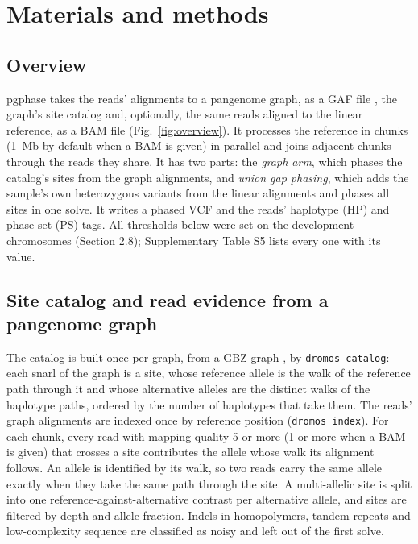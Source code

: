 \section{Materials and methods}

\subsection{Overview}

pgphase takes the reads' alignments to a pangenome graph, as a GAF file \citep{Li2020}, the graph's site catalog and, optionally, the same reads aligned to the linear reference, as a BAM file (Fig.~\ref{fig:overview}). It processes the reference in chunks (1~Mb by default when a BAM is given) in parallel and joins adjacent chunks through the reads they share. It has two parts: the \emph{graph arm}, which phases the catalog's sites from the graph alignments, and \emph{union gap phasing}, which adds the sample's own heterozygous variants from the linear alignments and phases all sites in one solve. It writes a phased VCF and the reads' haplotype (HP) and phase set (PS) tags. All thresholds below were set on the development chromosomes (Section 2.8); Supplementary Table S5 lists every one with its value.



\subsection{Site catalog and read evidence from a pangenome graph}

The catalog is built once per graph, from a GBZ graph \citep{Siren2022}, by \texttt{dromos catalog}: each snarl \citep{Paten2018} of the graph is a site, whose reference allele is the walk of the reference path through it and whose alternative alleles are the distinct walks of the haplotype paths, ordered by the number of haplotypes that take them. The reads' graph alignments are indexed once by reference position (\texttt{dromos index}). For each chunk, every read with mapping quality 5 or more (1 or more when a BAM is given) that crosses a site contributes the allele whose walk its alignment follows. An allele is identified by its walk, so two reads carry the same allele exactly when they take the same path through the site. A multi-allelic site is split into one reference-against-alternative contrast per alternative allele, and sites are filtered by depth and allele fraction. Indels in homopolymers, tandem repeats and low-complexity sequence are classified as noisy and left out of the first solve.

